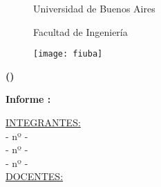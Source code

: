 

\begin{titlepage}
\centering
\begin{figure}[t]
	\centering
	{\huge  Universidad de Buenos Aires \par}
	{\huge Facultad de Ingeniería \par}
	\vspace{0.5cm}
	\texttt{[image: fiuba]}
    \vspace{1cm}
\end{figure}
	\vspace{1cm}
	{\huge \bfseries \nombreMateria \LARGE (\codigoMateria) \par}
	\vspace{1cm}
    {\textbf{\LARGE Informe \numeroInforme: \nombreInforme}\par}
    \vspace{2cm}
    {\underline{\Large INTEGRANTES:}\\}
    \vspace{0.5cm}
	{\nombreUno - nº \padronUno- \emph{\mailUno}\\ }
    \vspace{0.5cm}
	{\nombreDos - nº \padronDos- \emph{\mailDos}\\ }
	\vspace{0.5cm}
	{\nombreTres - nº \padronTres- \emph{\mailTres}\\ }
    \vspace{1cm}
    {\underline{\Large  DOCENTES:}\\}
    \vspace{0.5cm}
	{\Large\itshape  \docentes \par}
    \vspace{1cm}
    {\large \fecha \par}
	\vfill
\end{titlepage}

\pagestyle{fancy}
\fancyhead[C]{\rule{.5\textwidth}{4\baselineskip}}
\setlength{\headheight}{52pt}
\renewcommand{\sectionmark}[1]{\markboth{}{\thesection\ \ #1}}
\chead{}
\rhead{\codigoMateria - \nombreMateria}
\lfoot{}
\cfoot{\thepage}
\rfoot{}
